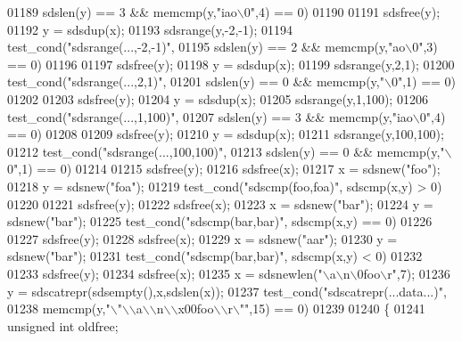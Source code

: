 \begin{DoxyCode}
{{{{{{{{{{{{{{{{{{{{01189             sdslen(y) == 3 && memcmp(y,\textcolor{stringliteral}{"iao\(\backslash\)0"},4) == 0)
01190 
01191         sdsfree(y);
01192         y = sdsdup(x);
01193         sdsrange(y,-2,-1);
01194         test\_cond(\textcolor{stringliteral}{"sdsrange(...,-2,-1)"},
01195             sdslen(y) == 2 && memcmp(y,\textcolor{stringliteral}{"ao\(\backslash\)0"},3) == 0)
01196 
01197         sdsfree(y);
01198         y = sdsdup(x);
01199         sdsrange(y,2,1);
01200         test\_cond(\textcolor{stringliteral}{"sdsrange(...,2,1)"},
01201             sdslen(y) == 0 && memcmp(y,\textcolor{stringliteral}{"\(\backslash\)0"},1) == 0)
01202 
01203         sdsfree(y);
01204         y = sdsdup(x);
01205         sdsrange(y,1,100);
01206         test\_cond(\textcolor{stringliteral}{"sdsrange(...,1,100)"},
01207             sdslen(y) == 3 && memcmp(y,\textcolor{stringliteral}{"iao\(\backslash\)0"},4) == 0)
01208 
01209         sdsfree(y);
01210         y = sdsdup(x);
01211         sdsrange(y,100,100);
01212         test\_cond(\textcolor{stringliteral}{"sdsrange(...,100,100)"},
01213             sdslen(y) == 0 && memcmp(y,\textcolor{stringliteral}{"\(\backslash\)0"},1) == 0)
01214 
01215         sdsfree(y);
01216         sdsfree(x);
01217         x = sdsnew(\textcolor{stringliteral}{"foo"});
01218         y = sdsnew(\textcolor{stringliteral}{"foa"});
01219         test\_cond(\textcolor{stringliteral}{"sdscmp(foo,foa)"}, sdscmp(x,y) > 0)
01220 
01221         sdsfree(y);
01222         sdsfree(x);
01223         x = sdsnew(\textcolor{stringliteral}{"bar"});
01224         y = sdsnew(\textcolor{stringliteral}{"bar"});
01225         test\_cond(\textcolor{stringliteral}{"sdscmp(bar,bar)"}, sdscmp(x,y) == 0)
01226 
01227         sdsfree(y);
01228         sdsfree(x);
01229         x = sdsnew(\textcolor{stringliteral}{"aar"});
01230         y = sdsnew(\textcolor{stringliteral}{"bar"});
01231         test\_cond(\textcolor{stringliteral}{"sdscmp(bar,bar)"}, sdscmp(x,y) < 0)
01232 
01233         sdsfree(y);
01234         sdsfree(x);
01235         x = sdsnewlen(\textcolor{stringliteral}{"\(\backslash\)a\(\backslash\)n\(\backslash\)0foo\(\backslash\)r"},7);
01236         y = sdscatrepr(sdsempty(),x,sdslen(x));
01237         test\_cond(\textcolor{stringliteral}{"sdscatrepr(...data...)"},
01238             memcmp(y,\textcolor{stringliteral}{"\(\backslash\)"\(\backslash\)\(\backslash\)a\(\backslash\)\(\backslash\)n\(\backslash\)\(\backslash\)x00foo\(\backslash\)\(\backslash\)r\(\backslash\)""},15) == 0)
01239 
01240         \{
01241             \textcolor{keywordtype}{unsigned} \textcolor{keywordtype}{int} oldfree;
}}}}}}}}}}}}}}}}}}}}
\end{DoxyCode}

